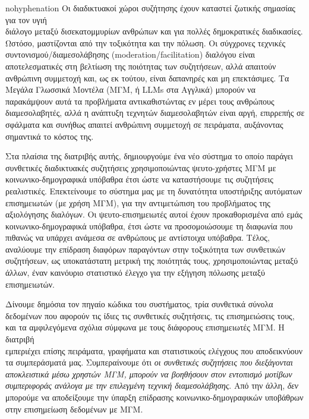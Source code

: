 \begin{hyphenrules}{nohyphenation}
	\sloppy
	Οι διαδικτυακοί χώροι συζήτησης έχουν καταστεί ζωτικής σημασίας για τον υγιή \\ διάλογο μεταξύ δισεκατομμυρίων ανθρώπων και για πολλές δημοκρατικές διαδικασίες. Ωστόσο, μαστίζονται από την τοξικότητα και την πόλωση. Οι σύγχρονες τεχνικές συντονισμού/διαμεσολάβησης (moderation/facilitation) διαλόγου είναι αποτελεσματικές στη βελτίωση της ποιότητας των συζητήσεων, αλλά απαιτούν ανθρώπινη συμμετοχή και, ως εκ τούτου, είναι δαπανηρές και μη επεκτάσιμες. Τα Μεγάλα Γλωσσικά Μοντέλα (ΜΓΜ, ή LLMs στα Αγγλικά) μπορούν να παρακάμψουν αυτά τα προβλήματα αντικαθιστώντας εν μέρει τους ανθρώπους διαμεσολαβητές, αλλά η ανάπτυξη τεχνητών διαμεσολαβητών είναι αργή, επιρρεπής σε σφάλματα και συνήθως απαιτεί ανθρώπινη συμμετοχή σε πειράματα, αυξάνοντας σημαντικά το κόστος της. 
	
	Στα πλαίσια της διατριβής αυτής, δημιουργούμε ένα νέο σύστημα το οποίο παράγει συνθετικές διαδικτυακές συζητήσεις χρησιμοποιώντας ψευτο-χρήστες ΜΓΜ με κοινωνικο-δημογραφικά υπόβαθρα έτσι ώστε να καταστήσουμε τις συζητήσεις ρεαλιστικές. Επεκτείνουμε το σύστημα μας με τη δυνατότητα υποστήριξης αυτόματων επισημειωτών (με χρήση ΜΓΜ), για την αντιμετώπιση του προβλήματος της αξιολόγησης διαλόγων. Οι ψευτο-επισημειωτές αυτοί έχουν προκαθορισμένα από εμάς κοινωνικο-δημογραφικά υπόβαθρα, έτσι ώστε να προσομοιώσουμε τη διαφωνία που πιθανώς να υπάρχει ανάμεσα σε ανθρώπους με αντίστοιχα υπόβαθρα. Τέλος, αναλύουμε την επίδραση διαφόρων παραγόντων στην τοξικότητα των συνθετικών συζητήσεων, ως υποκατάστατη μετρική της ποιότητάς τους, χρησιμοποιώντας μεταξύ άλλων, έναν καινόυριο στατιστικό έλεγχο για την εξήγηση πόλωσης μεταξύ επισημειωτών. 
	
	Δίνουμε δημόσια τον πηγαίο κώδικα του συστήματος, τρία συνθετικά σύνολα δεδομένων που αφορούν τις ίδιες τις συνθετικές συζητήσεις, τις επισημειώσεις τους, και τα αμφιλεγόμενα σχόλια σύμφωνα με τους διάφορους επισημειωτές ΜΓΜ. Η διατριβή \\εμπεριέχει επίσης πειράματα, γραφήματα και στατιστικούς ελέγχους που αποδεικνύουν τα συμπεράσματά μας. Συμπεραίνουμε ότι \textit{οι συνθετικές συζητήσεις που διεξάγονται αποκλειστικά μέσω χρηστών ΜΓΜ, μπορούν να βοηθήσουν στον εντοπισμό μοτίβων συμπεριφοράς ανάλογα με την επιλεγμένη τεχνική διαμεσολάβησης}. Από την άλλη, \textit{δεν} μπορούμε να αποδείξουμε την ύπαρξη επίδρασης κοινωνικο-δημογραφικών υποβάθρων στην επισημείωση δεδομένων με ΜΓΜ.
	\fussy
\end{hyphenrules}